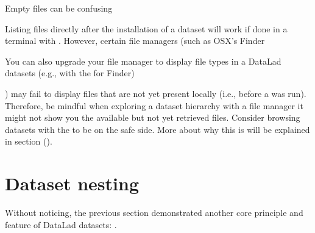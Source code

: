 \ignorespaces \begin{importantnote}[label={index-13}, before title={\thetcbcounter\ }, check odd page=true]{Empty files can be confusing}
\label{\detokenize{basics/101-105-install:index-13}}

\sphinxAtStartPar
Listing files directly after the installation of a dataset will
work if done in a terminal with .
However, certain file managers (such as OSX’s Finder%
\begin{footnote}\sphinxAtStartFootnote
You can also upgrade your file manager to display file types in a
DataLad datasets (e.g., with the
for Finder)
%
\end{footnote}) may fail to
display files that are not yet present locally (i.e., before a
 was run). Therefore, be  mindful when exploring
a dataset hierarchy with a file manager \textendash{} it might not show you
the available but not yet retrieved files.
Consider browsing datasets with the {\hyperref[\detokenize{glossary:term-DataLad-Gooey}]{}} to be on the safe side.
More about why this is will be explained in section {\hyperref[\detokenize{basics/101-115-symlinks:symlink}]{}} ().


\end{importantnote}

\sphinxstepscope

\ignorespaces 

\section{Dataset nesting}
\label{\detokenize{basics/101-106-nesting:dataset-nesting}}\label{\detokenize{basics/101-106-nesting:nesting}}\label{\detokenize{basics/101-106-nesting:index-0}}\label{\detokenize{basics/101-106-nesting::doc}}
\sphinxAtStartPar
Without noticing, the previous section demonstrated another core principle
and feature of DataLad datasets: .

